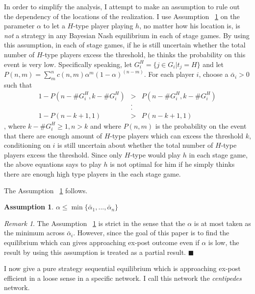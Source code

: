 \documentclass[12pt,letter]{article}
\newtheorem{assumption}{Assumption}[section]
\theoremstyle{remark}
\theoremstyle{remark}
\newtheorem*{remark}{Remark}
\theoremstyle{claim}
\begin{document}
In order to simplify the analysis, I attempt to make an assumption to rule out the dependency of the locations of the realization. I use Assumption ~\ref{asump_small} on the parameter $\alpha$ to let a $H$-type player playing $h$, no matter how his location is, is \textit{not} a strategy in any Bayesian Nash equilibrium in each of stage games. By using this assumption, in each of stage games, if he is still uncertain whether the total number of $H$-type players excess the threshold, he thinks the probability on this event is very low. Specifically speaking, let $G^H_i=\{j\in G_i|t_j=H\}$ and let $P(n,m)=\sum^n_m c(n,m)\alpha^m(1-\alpha)^{(n-m)}$. For each player $i$, choose a $\bar{\alpha}_i>0$ such that 
\begin{eqnarray*}
1-P(n-\#G^H_i,k-\#G^H_i) &>& P(n-\#G^H_i,k-\#G^H_i) \\
& . &\\
& . &\\
1-P(n-k+1,1) &>& P(n-k+1,1)
\end{eqnarray*}
, where $k-\#G^H_i\geq 1, n>k$ and where $P(n,m)$ is the probability on the event that there are enough amount of $H$-type players which can excess the threshold $k$, conditioning on $i$ is still uncertain about whether the total number of $H$-type players excess the threshold. Since only $H$-type would play $h$ in each stage game, the above equations says to play $h$ is not optimal for him if he simply thinks there are enough high type players in the each stage game. 

The Assumption ~\ref{asump_small} follows.

\begin{assumption}
\label{asump_small}
$\alpha\leq \min \{\bar{\alpha}_1,...,\bar{\alpha}_n\}$
\end{assumption}

\begin{remark}
The Assumption ~\ref{asump_small} is strict in the sense that the $\alpha$ is at most taken as the minimum across $\bar{\alpha}_i$. However, since the goal of this paper is to find the equilibrium which can gives approaching ex-post outcome even if $\alpha$ is low, the result by using this assumption is treated as a partial result. $\blacksquare$
\end{remark}


I now give a pure strategy sequential equilibrium which is approaching ex-post efficient in a loose sense in a specific network. I call this network the \textit{centipedes} network. 
\end{document}
